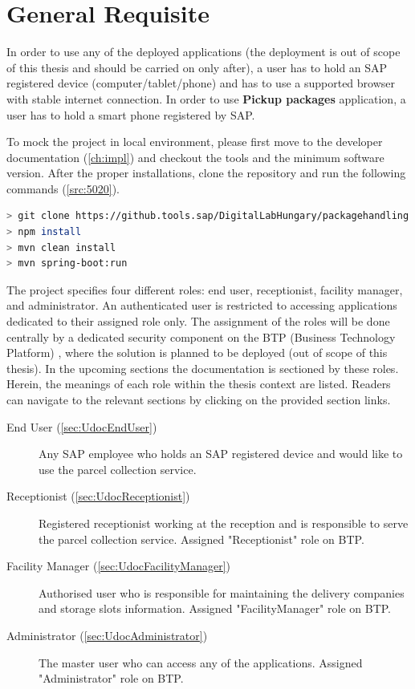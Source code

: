 \section{General Requisite}
\label{sec:GeneralRequisite}
In order to use any of the deployed applications (the deployment is out of scope of this thesis and should be carried on only after), a user has to hold an SAP registered device (computer/tablet/phone) and has to use a supported browser with stable internet connection. In order to use \textbf{Pickup packages} application, a user has to hold a smart phone registered by SAP. 

To mock the project in local environment, please first move to the developer documentation (\autoref{ch:impl}) and checkout the tools and the minimum software version. After the proper installations, clone the repository and run the following commands (\autoref{src:5020}).

\begin{lstlisting}[language={bash}]
> git clone https://github.tools.sap/DigitalLabHungary/packagehandling.git
> npm install
> mvn clean install
> mvn spring-boot:run
\end{lstlisting}

The project specifies four different roles: end user, receptionist, facility manager, and administrator. An authenticated user is restricted to accessing applications dedicated to their assigned role only. The assignment of the roles will be done centrally by a dedicated security component on the BTP (Business Technology Platform) \cite{btp}, where the solution is planned to be deployed (out of scope of this thesis). In the upcoming sections the documentation is sectioned by these roles. Herein, the meanings of each role within the thesis context are listed. Readers can navigate to the relevant sections by clicking on the provided section links.

\begin{description}
	\item[End User (\autoref{sec:UdocEndUser})] Any SAP employee who holds an SAP registered device and would like to use the parcel collection service.
	\item[Receptionist (\autoref{sec:UdocReceptionist})] Registered receptionist working at the reception and is responsible to serve the parcel collection service. Assigned "Receptionist" role on BTP.
	\item[Facility Manager (\autoref{sec:UdocFacilityManager})] Authorised user who is responsible for maintaining the delivery companies and storage slots information. Assigned "FacilityManager" role on BTP.
	\item[Administrator (\autoref{sec:UdocAdministrator})] The master user who can access any of the applications. Assigned "Administrator" role on BTP.
\end{description}

